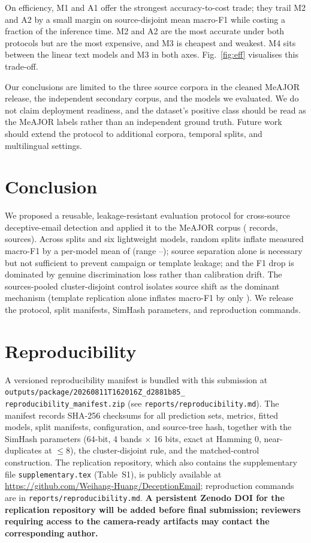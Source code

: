 \documentclass[conference]{IEEEtran}
\begin{document}
On efficiency, M1 and A1 offer the strongest accuracy-to-cost trade; they trail M2 and A2 by a small margin on source-disjoint mean macro-F1 while costing a fraction of the inference time. M2 and A2 are the most accurate under both protocols but are the most expensive, and M3 is cheapest and weakest. M4 sits between the linear text models and M3 in both axes. Fig.~\ref{fig:eff} visualises this trade-off.

Our conclusions are limited to the three source corpora in the cleaned MeAJOR release, the independent secondary corpus, and the models we evaluated. We do not claim deployment readiness, and the dataset's positive class should be read as the MeAJOR labels rather than an independent ground truth. Future work should extend the protocol to additional corpora, temporal splits, and multilingual settings.

\section{Conclusion}
We proposed a reusable, leakage-resistant evaluation protocol for cross-source deceptive-email detection and applied it to the MeAJOR corpus (\NDocs{} records, \NSources{} sources). Across \NSplits{} splits and six lightweight models, random splits inflate measured macro-F1 by a per-model mean of \MeanGeneralisationGap{} (range \GapMeanMTwo{}--\GapMeanMFour{}); source separation alone is necessary but not sufficient to prevent campaign or template leakage; and the F1 drop is dominated by genuine discrimination loss rather than calibration drift. The sources-pooled cluster-disjoint control isolates source shift as the dominant mechanism (template replication alone inflates macro-F1 by only \PooledClusterGapMean{}). We release the protocol, split manifests, SimHash parameters, and reproduction commands.

\section*{Reproducibility}
A versioned reproducibility manifest is bundled with this submission at \texttt{outputs/package/20260811T162016Z\_d2881b85\_\\reproducibility\_manifest.zip} (see \texttt{reports/reproducibility.md}). The manifest records SHA-256 checksums for all prediction sets, metrics, fitted models, split manifests, configuration, and source-tree hash, together with the SimHash parameters (64-bit, 4 bands $\times$ 16 bits, exact at Hamming 0, near-duplicates at $\le 8$), the cluster-disjoint rule, and the matched-control construction. The replication repository, which also contains the supplementary file \texttt{supplementary.tex} (Table~S1), is publicly available at \url{https://github.com/Weihang-Huang/DeceptionEmail}; reproduction commands are in \texttt{reports/reproducibility.md}. \textbf{A persistent Zenodo DOI for the replication repository will be added before final submission; reviewers requiring access to the camera-ready artifacts may contact the corresponding author.}
\end{document}
